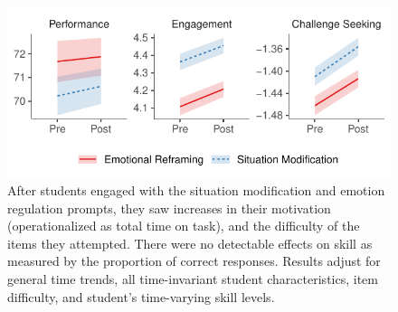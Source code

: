 \documentclass[11pt]{report}
\begin{document}
\begin{mainf}
\begin{figure}[ht]
    \centering
    \includegraphics[width=\linewidth]{main.pdf}
    \caption{After students engaged with the situation modification and emotion regulation prompts, they saw increases in their motivation (operationalized as total time on task), and the difficulty of the items they attempted. 
    There were no detectable effects on skill as measured by the proportion of correct responses. 
    Results adjust for general time trends, all time-invariant student characteristics, item difficulty, and student's time-varying skill levels.}
    \label{fig:main}
\end{figure}


\end{mainf}
\end{document}
